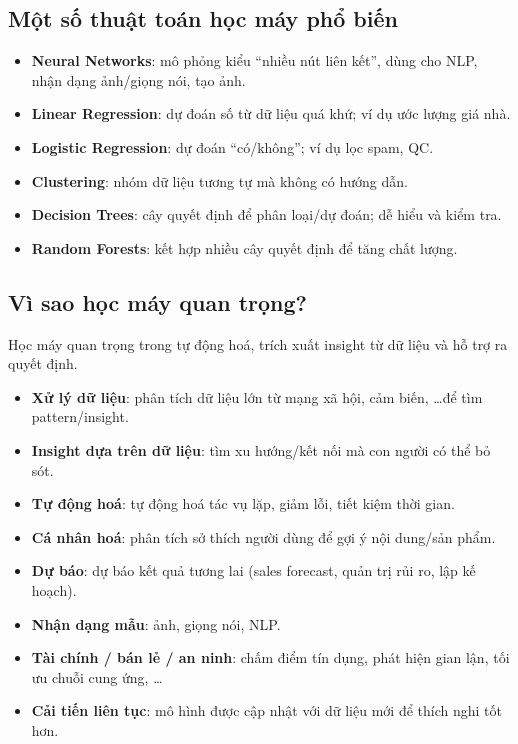 \subsection{Một số thuật toán học máy phổ biến}

\begin{phuongphap}[title={Danh sách thuật toán}]
\begin{itemize}
  \item \textbf{Neural Networks}: mô phỏng kiểu “nhiều nút liên kết”, dùng cho NLP, nhận dạng ảnh/giọng nói, tạo ảnh.
  \item \textbf{Linear Regression}: dự đoán số từ dữ liệu quá khứ; ví dụ ước lượng giá nhà.
  \item \textbf{Logistic Regression}: dự đoán “có/không”; ví dụ lọc spam, QC.
  \item \textbf{Clustering}: nhóm dữ liệu tương tự mà không có hướng dẫn.
  \item \textbf{Decision Trees}: cây quyết định để phân loại/dự đoán; dễ hiểu và kiểm tra.
  \item \textbf{Random Forests}: kết hợp nhiều cây quyết định để tăng chất lượng.
\end{itemize}
\end{phuongphap}

\subsection{Vì sao học máy quan trọng?}

\begin{dongco}[title={Ý nghĩa tổng quát}]
Học máy quan trọng trong tự động hoá, trích xuất insight từ dữ liệu và hỗ trợ ra quyết định.
\end{dongco}

\begin{phuongphap}[title={Một số lý doML}]
\begin{itemize}
  \item \textbf{Xử lý dữ liệu}: phân tích dữ liệu lớn từ mạng xã hội, cảm biến, \ldots để tìm pattern/insight.
  \item \textbf{Insight dựa trên dữ liệu}: tìm xu hướng/kết nối mà con người có thể bỏ sót.
  \item \textbf{Tự động hoá}: tự động hoá tác vụ lặp, giảm lỗi, tiết kiệm thời gian.
  \item \textbf{Cá nhân hoá}: phân tích sở thích người dùng để gợi ý nội dung/sản phẩm.
  \item \textbf{Dự báo}: dự báo kết quả tương lai (sales forecast, quản trị rủi ro, lập kế hoạch).
  \item \textbf{Nhận dạng mẫu}: ảnh, giọng nói, NLP.
  \item \textbf{Tài chính / bán lẻ / an ninh}: chấm điểm tín dụng, phát hiện gian lận, tối ưu chuỗi cung ứng, \ldots
  \item \textbf{Cải tiến liên tục}: mô hình được cập nhật với dữ liệu mới để thích nghi tốt hơn.
\end{itemize}
\end{phuongphap}

